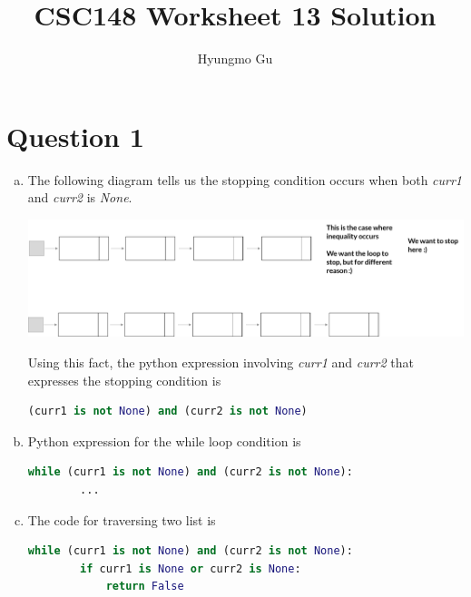 \documentclass[12pt]{article}
\begin{document}
\title{CSC148 Worksheet 13 Solution}
\author{Hyungmo Gu}
\maketitle

\section*{Question 1}
\begin{enumerate}[a.]
    \item

    The following diagram tells us the stopping condition occurs when both
    \textit{curr1} and \textit{curr2} is \textit{None}.

    \begin{center}
    \includegraphics[width=\linewidth]{images/worksheet_13_q1a_solution.png}
    \end{center}

    \bigskip

    Using this fact, the python expression involving \textit{curr1}
    and \textit{curr2} that expresses the stopping condition is

    \bigskip

    \begin{lstlisting}[language=Python]
    (curr1 is not None) and (curr2 is not None)
    \end{lstlisting}

    \item

    Python expression for the while loop condition is

    \begin{lstlisting}[language=Python]
    while (curr1 is not None) and (curr2 is not None):
        ...
    \end{lstlisting}

    \item

    The code for traversing two list is

    \begin{lstlisting}[language=Python]
    while (curr1 is not None) and (curr2 is not None):
        if curr1 is None or curr2 is None:
            return False


\end{lstlisting}
\end{enumerate}
\end{document}
